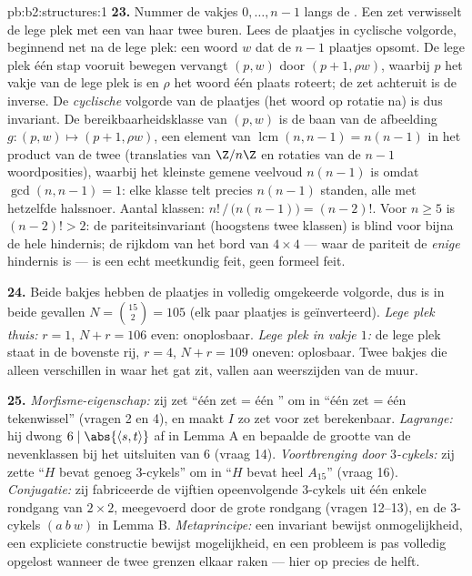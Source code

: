 \begin{solution}{pb:b2:structures:1}
\textbf{23.} Nummer de vakjes $0, \dots, n-1$ langs de . Een
zet verwisselt de lege plek met een van haar twee buren. Lees de
plaatjes in cyclische volgorde, beginnend net na de lege plek: een
woord $w$ dat de $n - 1$ plaatjes opsomt. De lege plek één stap
vooruit bewegen vervangt $(p, w)$ door $(p + 1, \rho w)$, waarbij
$p$ het vakje van de lege plek is en $\rho$ het woord  één
plaats roteert; de zet achteruit is de inverse. De \emph{cyclische}
volgorde van de plaatjes (het woord op rotatie na) is dus
invariant. De bereikbaarheidsklasse van $(p, w)$ is de baan van de
afbeelding $g \colon (p, w) \mapsto (p+1, \rho w)$, een element
van  $\operatorname{lcm}(n, n-1) = n(n-1)$ in het product van
de twee  (translaties van $\Z/n\Z$ en rotaties
van de $n-1$ woordposities), waarbij het kleinste gemene veelvoud
$n(n-1)$ is omdat $\gcd(n, n-1) = 1$: elke klasse telt precies
$n(n-1)$ standen, alle met hetzelfde halssnoer. Aantal klassen:
$n!\,/\,\bigl(n(n-1)\bigr) = (n-2)!$. Voor $n \geq 5$ is $(n-2)! >
2$: de pariteitsinvariant (hoogstens twee klassen) is blind voor
bijna de hele hindernis; de rijkdom van het bord van $4 \times 4$
--- waar de pariteit de \emph{enige} hindernis is --- is een echt
meetkundig feit, geen formeel feit.

\textbf{24.} Beide bakjes hebben de plaatjes in volledig
omgekeerde volgorde, dus is in beide gevallen $N = \binom{15}{2} =
105$ (elk paar plaatjes is geïnverteerd). \emph{Lege plek thuis:}
$r = 1$, $N + r = 106$ even: onoplosbaar. \emph{Lege plek in vakje
$1$:} de lege plek staat in de bovenste rij, $r = 4$, $N + r =
109$ oneven: oplosbaar. Twee bakjes die alleen verschillen in waar
het gat zit, vallen aan weerszijden van de muur.

\textbf{25.} \emph{Morfisme-eigenschap:} zij zet ``één zet = één
'' om in ``één zet = één tekenwissel'' (vragen 2 en
4), en maakt $I$ zo zet voor zet berekenbaar. \emph{Lagrange:} hij
dwong $6 \mid \abs{\langle s, t\rangle}$ af in Lemma A en bepaalde
de grootte van de nevenklassen bij het uitsluiten van  $6$
(vraag 14). \emph{Voortbrenging door $3$-cykels:} zij zette ``$H$
bevat genoeg $3$-cykels'' om in ``$H$ bevat heel $A_{15}$'' (vraag
16). \emph{Conjugatie:} zij fabriceerde de vijftien opeenvolgende
$3$-cykels uit één enkele rondgang van $2 \times 2$, meegevoerd
door de grote rondgang (vragen 12--13), en de $3$-cykels $(a\ b\
w)$ in Lemma B. \emph{Metaprincipe:} een invariant bewijst
onmogelijkheid, een expliciete constructie bewijst mogelijkheid,
en een probleem is pas volledig opgelost wanneer de twee grenzen
elkaar raken --- hier op precies de helft.
\end{solution}
